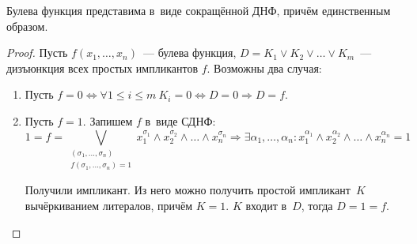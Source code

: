 \begin{statement}
Булева функция представима в~виде сокращённой ДНФ, причём единственным образом.
\end{statement}
\begin{proof}
Пусть $f(x_1, \ldots, x_n)$~--- булева функция, $D = K_1 \lor K_2 \lor \ldots \lor K_m$~--- дизъюнкция всех простых импликантов $f$.
Возможны два случая:
\begin{enumerate}
	\item Пусть $f = 0 \Leftrightarrow
	\forall 1 \leqslant i \leqslant m \ K_i = 0 \Leftrightarrow
	D = 0 \Rightarrow
	D = f$.
	
	\item Пусть $f = 1$.
	Запишем $f$ в~виде СДНФ:
	\begin{equation*}
	1 = f = \bigvee_{\begin{smallmatrix}
	(\sigma_1, \ldots, \sigma_n) \\
	f(\sigma_1, \ldots, \sigma_n) = 1
	\end{smallmatrix}} x_1^{\sigma_1} \land x_2^{\sigma_2} \land \ldots \land x_n^{\sigma_n} \Rightarrow
	\exists \alpha_1, \ldots, \alpha_n \colon x_1^{\alpha_1} \land x_2^{\alpha_2} \land \ldots \land x_n^{\alpha_n} = 1
	\end{equation*}
	
	Получили импликант.
	Из него можно получить простой импликант~$K$ вычёркиванием литералов, причём $K = 1$.
	$K$ входит в~$D$, тогда $D = 1 = f$.
\end{enumerate}
\end{proof}